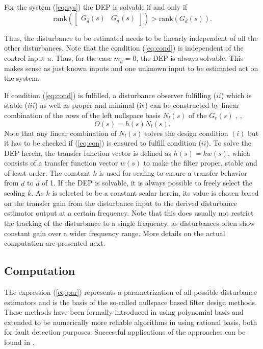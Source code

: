 \documentclass[graybox]{svmult}
\begin{document}
\begin{theorem}
	For the system (\ref{eq:sys}) the DEP is solvable if and only if
	\begin{equation}\label{eq:cond}
		\text{rank}\left( 
		\begin{bmatrix}
			G_{\bar d}(s)  &  G_{d}(s) 
		\end{bmatrix} \right)
		>
		\text{rank} 
		(G_{\bar d}(s)).
	\end{equation}
\end{theorem}
\vspace{+3mm}
Thus, the disturbance to be estimated needs to be linearly independent of all the other disturbances. Note that the condition (\ref{eq:cond}) is independent of the control input $u$. Thus, for the case $m_{\bar d} = 0$, the DEP is always solvable. This makes sense as just known inputs and one unknown  input to be estimated act on the system.

If condition (\ref{eq:cond}) is fulfilled, a disturbance observer fulfilling ($ii$) which is stable ($iii$) as well as proper and minimal (iv)  can be constructed by linear combination of the rows of the left nullspace basis $N_l(s)$ of the $G_e(s)$ \cite{Var09}, \ie,
\begin{equation}\label{eq:par}
	O(s) = h(s) N_l(s).
\end{equation}
Note that any linear combination of $N_l(s)$ solves the design condition $(i)$ but it has to be checked if (\ref{eq:con}) is ensured to fulfill condition ($ii$).
To solve the DEP herein, the transfer function vector is defined as $h(s) = k w(s)$, which consists of a transfer function vector $w(s)$  to make the filter proper, stable and of least order. The constant  $k$ is used for scaling to ensure a transfer behavior from $d$ to $\tilde d$ of 1. If the DEP is solvable, it is always possible to freely select the scaling $k$. 
As $k$ is selected to be a constant scalar herein, its value is chosen based on the transfer gain from the disturbance input to the derived disturbance estimator output at a certain frequency. Note that this does usually not restrict the tracking of the disturbance to a single frequency, as disturbances often show constant gain over a wider frequency range. More details on the actual computation are presented next.


\subsection{Computation}
The  expression (\ref{eq:par}) represents a parametrization of all possible disturbance estimators and is the basis of the so-called nullspace based filter design methods. These methods have been formally introduced in \cite{frisk_01} using polynomial basis and extended to be numerically more reliable algorithms in \cite{varga07, Var09} using rational basis, both for fault detection purposes. Successful applications of the approaches can be found in \cite{ossmann15c,VOss_13a,Ossmann17}. 
\end{document}
